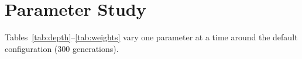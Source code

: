 \section{Parameter Study}
Tables~\ref{tab:depth}--\ref{tab:weights} vary one parameter at a time around
the default configuration (300 generations).

\begin{table}[h]\centering\small
\caption{Maximum tree depth.}\label{tab:depth}\end{table}
\begin{table}[h]\centering\small
\caption{Population size.}\label{tab:pop}\end{table}
\begin{table}[h]\centering\small
\caption{Number of generations.}\label{tab:gens}\end{table}
\begin{table}[h]\centering\small
\caption{Hoist rate.}\label{tab:hoist}\end{table}
\begin{table}[h]\centering\small
\caption{Number of generations between world changes ($\infty$: one training world).}\label{tab:switch}\end{table}
\begin{table}[h]\centering\small
\caption{Fitness weights.}\label{tab:weights}\end{table}

